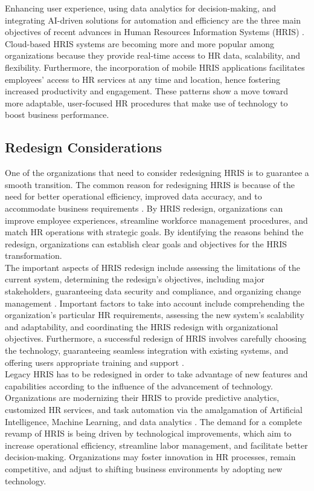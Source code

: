         Enhancing user experience, using data analytics for decision-making, and integrating AI-driven solutions for automation and efficiency are the three main objectives of recent advances in Human Resources Information Systems (HRIS) \cite{s22024}. Cloud-based HRIS systems are becoming more and more popular among organizations because they provide real-time access to HR data, scalability, and flexibility. Furthermore, the incorporation of mobile HRIS applications facilitates employees' access to HR services at any time and location, hence fostering increased productivity and engagement. These patterns show a move toward more adaptable, user-focused HR procedures that make use of technology to boost business performance.
    
    \subsection{Redesign Considerations}
         One of the organizations that need to consider redesigning HRIS is to guarantee a smooth transition. The common reason for redesigning HRIS is because of the need for better operational efficiency, improved data accuracy, and to accommodate business requirements \cite{m12023}. By HRIS redesign, organizations can improve employee experiences, streamline workforce management procedures, and match HR operations with strategic goals. By identifying the reasons behind the redesign, organizations can establish clear goals and objectives for the HRIS transformation.
         \\

        The important aspects of HRIS redesign include assessing the limitations of the current system, determining the redesign's objectives, including major stakeholders, guaranteeing data security and compliance, and organizing change management \cite{is12020}. Important factors to take into account include comprehending the organization's particular HR requirements, assessing the new system's scalability and adaptability, and coordinating the HRIS redesign with organizational objectives. Furthermore, a successful redesign of HRIS involves carefully choosing the technology, guaranteeing seamless integration with existing systems, and offering users appropriate training and support \cite{ymqz12022}.
        \\
        
        Legacy HRIS has to be redesigned in order to take advantage of new features and capabilities according to the influence of the advancement of technology. Organizations are modernizing their HRIS to provide predictive analytics, customized HR services, and task automation via the amalgamation of Artificial Intelligence, Machine Learning, and data analytics \cite{mee12022}. The demand for a complete revamp of HRIS is being driven by technological improvements, which aim to increase operational efficiency, streamline labor management, and facilitate better decision-making. Organizations may foster innovation in HR processes, remain competitive, and adjust to shifting business environments by adopting new technology.
    
